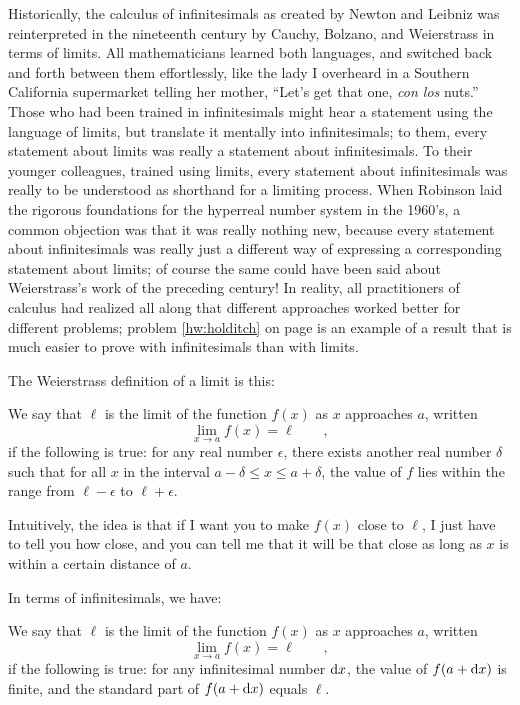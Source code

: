 Historically, the calculus of infinitesimals as created by Newton and Leibniz was reinterpreted
in the nineteenth century by Cauchy, Bolzano, and Weierstrass in terms of limits. All mathematicians
learned both languages, and switched back and forth between them effortlessly, like the lady I
overheard in a Southern California supermarket telling her mother, ``Let's get that one, \emph{con los} nuts.''
Those who had been trained in infinitesimals might hear a statement using the language of limits, but
translate it mentally into infinitesimals; to them, every statement about limits was really a statement
about infinitesimals. To their younger colleagues, trained using limits, every statement about infinitesimals
was really to be understood as shorthand for a limiting process. When Robinson laid the rigorous foundations
for the hyperreal number system in the 1960's, a common objection was that it was really nothing new, because
every statement about infinitesimals was really just a different way of expressing a corresponding statement
about limits; of course the same could have been said about Weierstrass's work of the preceding century!
In reality, all practitioners of calculus had realized all along that different approaches worked better for
different problems; problem \ref{hw:holditch} on page \pageref{hw:holditch} is an example of a result that
is much easier to prove with infinitesimals than with limits.

The Weierstrass definition of a limit is this:
\begin{important}
We say that $\ell$ is the limit of the function $f(x)$ as $x$ approaches $a$, written
\begin{equation*}
  \lim_{x\rightarrow a} f(x) = \ell \qquad ,
\end{equation*}
if the following is true: for any real number $\epsilon$, there exists another real number
$\delta$ such that for all $x$ in the interval $a-\delta\le x \le a+\delta$,
the value of $f$ lies within the range from $\ell-\epsilon$ to $\ell+\epsilon$.
\end{important}
Intuitively, the idea is that if I want you to make $f(x)$ close to $\ell$, I just have
to tell you how close, and you can tell me that it will be that close as long as
$x$ is within a certain distance of $a$.

In terms of infinitesimals, we have:
\begin{important}
We say that $\ell$ is the limit of the function $f(x)$ as $x$ approaches $a$, written
\begin{equation*}
  \lim_{x\rightarrow a} f(x) = \ell \qquad ,
\end{equation*}
if the following is true: for any infinitesimal number $\textup{d} x$, 
the value of $f(a+\textup{d} x)$ is finite, and the standard
part of $f(a+\textup{d} x)$ equals $\ell$.
\end{important}

